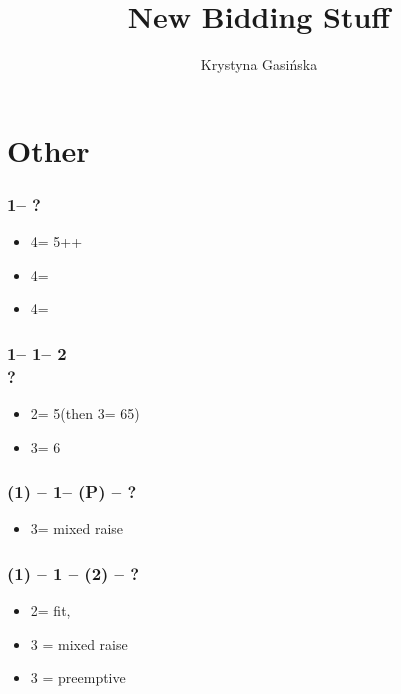 \documentclass[12pt, a4paper]{article}
\title{New Bidding Stuff}
\author{Krystyna Gasińska}
\begin{document}
\maketitle

\section{Other}

\subsubsection*{1\clubs -- ?}
\begin{itemize}
    \item 4\clubs = 5++\spades
    \item 4\diams = \hearts
    \item 4\hearts = \spades
\end{itemize}

\subsubsection*{1\clubs -- 1\spades -- 2\diams\\
                ?}
\begin{itemize}
    \item 2\spades = 5\spades (then 3\spades = 65)
    \item 3\clubs = 6\spades
\end{itemize}

\subsubsection*{(1\minor) -- 1\hearts -- (P) -- ?}
\begin{itemize}
    \item 3\minor = mixed raise
\end{itemize}

\subsubsection*{(1) -- 1 -- (2) -- ?}
\begin{itemize}
    \item 2\nt = fit, \invp
    \item 3 = mixed raise
    \item 3 = preemptive
\end{itemize}
\end{document}
